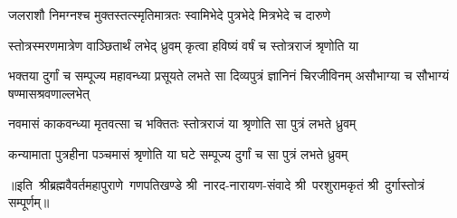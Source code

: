 \twolineshloka
{जलराशौ निमग्नश्च मुक्तस्तत्स्मृतिमात्रतः}
{स्वामिभेदे पुत्रभेदे मित्रभेदे च दारुणे}

\twolineshloka
{स्तोत्रस्मरणमात्रेण वाञ्छितार्थं लभेद् ध्रुवम्}
{कृत्वा हविष्यं वर्षं च स्तोत्रराजं श्रृणोति या}

\threelineshloka
{भक्तया दुर्गां च सम्पूज्य महावन्ध्या प्रसूयते}
{लभते सा दिव्यपुत्रं ज्ञानिनं चिरजीविनम्}
{असौभाग्या च सौभाग्यं षण्मासश्रवणाल्लभेत्}

\twolineshloka
{नवमासं काकवन्ध्या मृतवत्सा च भक्तितः}
{स्तोत्रराजं या श्रृणोति सा पुत्रं लभते ध्रुवम्}

\twolineshloka
{कन्यामाता पुत्रहीना पञ्चमासं श्रृणोति या}
{घटे सम्पूज्य दुर्गां च सा पुत्रं लभते ध्रुवम्}


{॥इति~श्रीब्रह्मवैवर्तमहापुराणे~गणपतिखण्डे श्री~नारद-नारायण-संवादे श्री~परशुरामकृतं श्री~दुर्गास्तोत्रं सम्पूर्णम्॥}